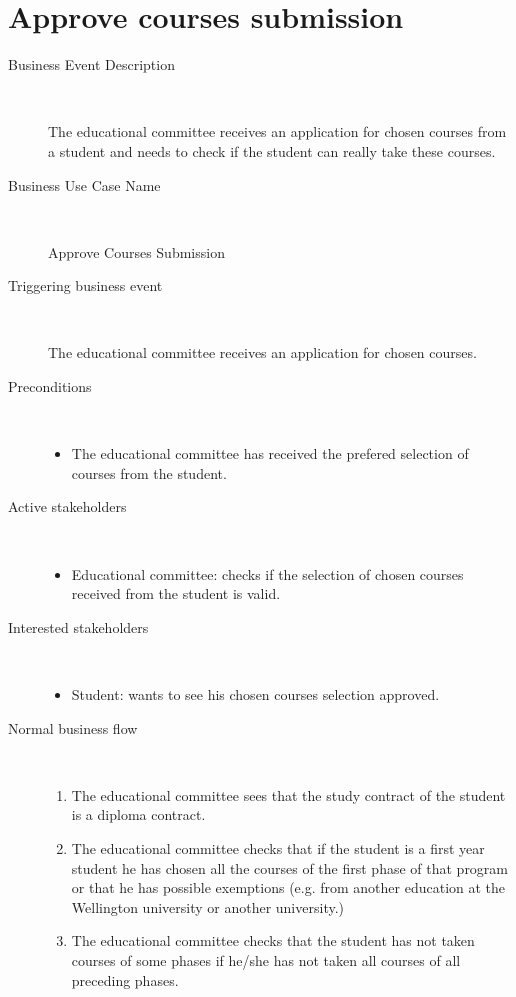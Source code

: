 \section{Approve courses submission}
\begin{description}
	\item[Business Event Description] \ 
		\par The educational committee receives an application for chosen courses from
		a student and needs to check if the student can really take these courses.
	\item[Business Use Case Name] \ 
		\par Approve Courses Submission
	\item[Triggering business event] \ 
		\par The educational committee receives an application for chosen courses.
	\item[Preconditions] \
	\begin{itemize}
		\item The educational committee has received the prefered selection of courses
		from the student.
	\end{itemize}
	\item[Active stakeholders] \ 
	\begin{itemize}
		\item Educational committee: checks if the selection of chosen courses
		received from the student is valid.
	\end{itemize}
	\item[Interested stakeholders] \ 
		\begin{itemize}		
		\item Student: wants to see his chosen courses selection approved.
		\end{itemize}
	\item[Normal business flow] \ 
	\begin{enumerate}
	  	\item The educational committee sees that the study contract of the student
	  	is a diploma contract.
	  	\item The educational committee checks that if the student is a first year
	  	student he has chosen all the courses of the first phase of that program or
	  	that he has possible exemptions (e.g. from another education at the
	  	Wellington university or another university.)
	  	\item The educational committee checks that the student has not taken courses 
	  	of some phases if he/she has not taken all courses of all preceding phases.

\end{enumerate}
\end{description}

